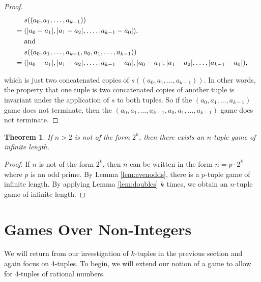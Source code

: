 \documentclass[12pt]{amsart}
\newtheorem{theorem}{Theorem}[section]
\newcommand{\diff}{s}
\begin{document}
\begin{proof}


\begin{align*}
&\diff((a_0, a_1, \ldots, a_{k-1})) \\
= \hspace{.1cm} & (|a_0 - a_1|, |a_1 - a_2|, \ldots, |a_{k-1} - a_0|), \\
& \mathrm{and}\\ 
& \diff((a_0, a_1, \ldots, a_{k-1}, a_0, a_1, \ldots, a_{k-1})) \\
= \hspace{.1cm} & (|a_0 - a_1|, |a_1 - a_2|, \ldots, |a_{k-1} - a_0|, |a_0 - a_1|, |a_1 - a_2|, \ldots, |a_{k-1} - a_0|),
\end{align*}

which is just two concatenated copies of $\diff((a_0, a_1, \ldots, a_{k-1}))$. In other words, the property that one tuple is two concatenated copies of another tuple is invariant under the application of $\diff$ to both tuples. So if the $(a_0, a_1, \ldots, a_{k-1})$ game does not terminate, then the $(a_0, a_1, \ldots, a_{k-1}, a_0, a_1, \ldots, a_{k-1})$ game does not terminate.

\end{proof}

\begin{theorem}
\label{theorem:notPowersOfTwo}
If $n > 2$ is not of the form $2^k$, then there exists an $n$-tuple game of infinite length.
\end{theorem}

\begin{proof}

If $n$ is not of the form $2^k$, then $n$ can be written in the form $n = p \cdot 2^k$ where $p$ is an odd prime. By Lemma \ref{lem:evenodds}, there is a $p$-tuple game of infinite length. By applying Lemma \ref{lem:doubles} $k$ times, we obtain an $n$-tuple game of infinite length. 
\end{proof}



\section{Games Over Non-Integers\label{sec:nonIntegers}}

We will return from our investigation of $k$-tuples in the previous section and again focus on $4$-tuples. To begin, we will extend our notion of a game to allow for $4$-tuples of rational numbers.
\end{document}
